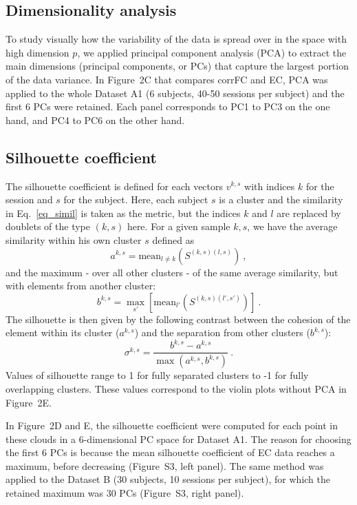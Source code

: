 \documentclass{article}
\begin{document}
\subsection{Dimensionality analysis}

To study visually how the variability of the data is spread over in the space with high dimension $p$, we applied principal component analysis (PCA) to extract the main dimensions (principal components, or PCs) that capture the largest portion of the data variance. In Figure~2C that compares corrFC and EC, PCA was applied to the whole Dataset A1 (6 subjects, 40-50 sessions per subject) and the first 6 PCs were retained. Each panel corresponds to PC1 to PC3 on the one hand, and PC4 to PC6 on the other hand. 

\subsection{Silhouette coefficient}

The silhouette coefficient \cite{Rousseeuw1987} is defined for each vectors $v^{k,s}$ with indices $k$ for the session and $s$ for the subject.
Here, each subject $s$ is a cluster and the similarity in Eq.~\eqref{eq_simil} is taken as the metric, but the indices $k$ and $l$ are replaced by doublets of the type $(k,s)$ here.
For a given sample ${k,s}$, we have the average similarity within his own cluster $s$ defined as
\begin{equation}
a^{k,s} = \mathrm{mean}_{l \neq k}(S^{(k,s)(l,s)})
\ ,
\end{equation}
and the maximum - over all other clusters - of the same average similarity, but with elements from another cluster:
\begin{equation}
b^{k,s} =  \max_{s'}[\mathrm{mean}_{l'}(S^{(k,s)(l',s')})]
\ .
\end{equation}
The silhouette is then given by the following contrast between the cohesion of the element within its cluster ($a^{k,s}$) and the separation from other clusters ($b^{k,s}$):
\begin{equation}
\sigma^{k,s} = \frac{b^{k,s} - a^{k,s}}{\max(a^{k,s},b^{k,s})}
\ .
\end{equation}
Values of silhouette range to 1 for fully separated clusters to -1 for fully overlapping clusters. These values correspond to the violin plots without PCA in Figure~2E.

In Figure~2D and E, the silhouette coefficient were computed for each point in these clouds in a 6-dimensional PC space for Dataset A1. The reason for choosing the first 6 PCs is because the mean silhouette coefficient of EC data reaches a maximum, before decreasing (Figure~S3, left panel).
The same method was applied to the Dataset B (30 subjects, 10 sessions per subject), for which the retained maximum was 30 PCs (Figure~S3, right panel).
\end{document}
